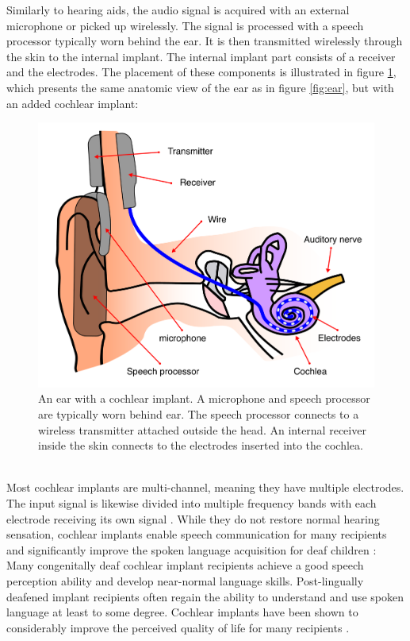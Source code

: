 \documentclass[english, 12pt, a4paper, pdftex, elec, utf8]{aaltothesis}
\begin{document}
Similarly to hearing aids, the audio signal is acquired with an external microphone or picked up wirelessly. The signal is processed with a speech processor typically worn behind the ear. It is then transmitted wirelessly through the skin to the internal implant. The internal implant part consists of a receiver and the electrodes. The placement of these components is illustrated in figure \ref{fig:implant}, which presents the same anatomic view of the ear as in figure \ref{fig:ear}, but with an added cochlear implant: \\
\begin{figure}[h]
	\centering 
	\includegraphics[width=\textwidth]{implant.pdf}
	\vspace{0.5mm}
	\caption{An ear with a cochlear implant. A microphone and speech processor are typically worn behind ear. The speech processor connects to a wireless transmitter attached outside the head. An internal receiver inside the skin connects to the electrodes inserted into the cochlea. \cite{moore2007cochlear, peterson2010cochlear}}
	\label{fig:implant} 
\end{figure} \\
Most cochlear implants are multi-channel, meaning they have multiple electrodes. The input signal is likewise divided into multiple frequency bands with each electrode receiving its own signal \cite{moore2007cochlear, friesen2001speech}. While they do not restore normal hearing sensation, cochlear implants enable speech communication for many recipients and significantly improve the spoken language acquisition for deaf children \cite{stacey2006hearing, raino2012sisakorvaistutteen}: Many congenitally deaf cochlear implant recipients achieve a good speech perception ability and develop near-normal language skills. Post-lingually deafened implant recipients often regain the ability to understand and use spoken language at least to some degree. Cochlear implants have been shown to considerably improve the perceived quality of life for many recipients \cite{blomberg2012sisakorvaistutetta}. \\\\
\end{document}
